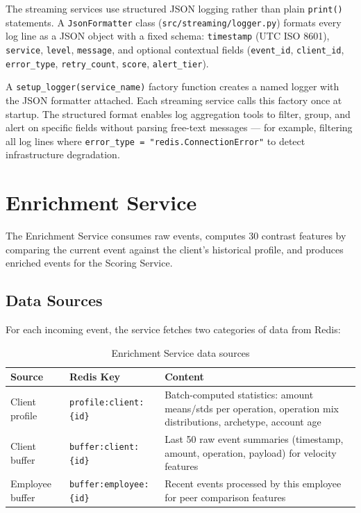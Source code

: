 The streaming services use structured JSON logging rather than plain
\texttt{print()} statements. A \texttt{JsonFormatter} class
(\texttt{src/streaming/logger.py}) formats every log line as a JSON object
with a fixed schema: \texttt{timestamp} (UTC ISO 8601), \texttt{service},
\texttt{level}, \texttt{message}, and optional contextual fields
(\texttt{event\_id}, \texttt{client\_id}, \texttt{error\_type},
\texttt{retry\_count}, \texttt{score}, \texttt{alert\_tier}).

A \texttt{setup\_logger(service\_name)} factory function creates a named
logger with the JSON formatter attached. Each streaming service calls
this factory once at startup. The structured format enables log aggregation
tools to filter, group, and alert on specific fields without parsing free-text
messages --- for example, filtering all log lines where
\texttt{error\_type = "redis.ConnectionError"} to detect infrastructure
degradation.

\section{Enrichment Service}

The Enrichment Service consumes raw events, computes 30 contrast features by
comparing the current event against the client's historical profile, and
produces enriched events for the Scoring Service.

\subsection{Data Sources}

For each incoming event, the service fetches two categories of data from Redis:

\begin{table}[H]
\centering
\caption{Enrichment Service data sources}
\label{tab:enrichment-sources}
\begin{tabular}{@{}llp{6cm}@{}}
\toprule
\textbf{Source} & \textbf{Redis Key} & \textbf{Content} \\
\midrule
Client profile & \texttt{profile:client:\{id\}} & Batch-computed statistics:
    amount means/stds per operation, operation mix distributions, archetype,
    account age \\
Client buffer  & \texttt{buffer:client:\{id\}} & Last 50 raw event summaries
    (timestamp, amount, operation, payload) for velocity features \\
Employee buffer & \texttt{buffer:employee:\{id\}} & Recent events processed
    by this employee for peer comparison features \\
\bottomrule
\end{tabular}
\end{table}

